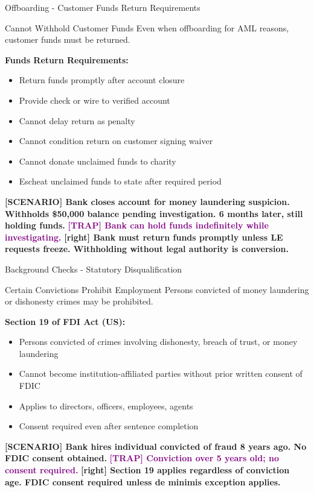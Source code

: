 \documentclass[11pt,a4paper]{beamer}
\newcommand{\trap}[1]{\textcolor{purple}{\textbf{[TRAP] #1}}}
\newcommand{\correct}[1]{\textcolor{green!50!black}{\textbf{[right] #1}}}
\newcommand{\scenario}[1]{\textcolor{blue!70!black}{\textbf{[SCENARIO] #1}}}
\begin{document}
\begin{frame}{Offboarding - Customer Funds Return Requirements}
\begin{block}{Cannot Withhold Customer Funds}
Even when offboarding for AML reasons, customer funds must be returned.
\end{block}
\textbf{Funds Return Requirements:}
\begin{itemize}
\item Return funds promptly after account closure
\item Provide check or wire to verified account
\item Cannot delay return as penalty
\item Cannot condition return on customer signing waiver
\item Cannot donate unclaimed funds to charity
\item Escheat unclaimed funds to state after required period
\end{itemize}
\scenario{Bank closes account for money laundering suspicion. Withholds \$50,000 balance pending investigation. 6 months later, still holding funds.}
\trap{Bank can hold funds indefinitely while investigating.}
\correct{Bank must return funds promptly unless LE requests freeze. Withholding without legal authority is conversion.}
\end{frame}


\begin{frame}{Background Checks - Statutory Disqualification}
\begin{block}{Certain Convictions Prohibit Employment}
Persons convicted of money laundering or dishonesty crimes may be prohibited.
\end{block}
\textbf{Section 19 of FDI Act (US):}
\begin{itemize}
\item Persons convicted of crimes involving dishonesty, breach of trust, or money laundering
\item Cannot become institution-affiliated parties without prior written consent of FDIC
\item Applies to directors, officers, employees, agents
\item Consent required even after sentence completion
\end{itemize}
\scenario{Bank hires individual convicted of fraud 8 years ago. No FDIC consent obtained.}
\trap{Conviction over 5 years old; no consent required.}
\correct{Section 19 applies regardless of conviction age. FDIC consent required unless de minimis exception applies.}
\end{frame}
\end{document}
